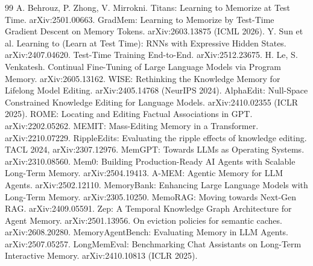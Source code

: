 \documentclass[11pt]{article}
\begin{document}
\begin{thebibliography}{99}\small
{} A. Behrouz, P. Zhong, V. Mirrokni. Titans: Learning to Memorize
  at Test Time. arXiv:2501.00663.
 GradMem: Learning to Memorize by Test-Time Gradient Descent on
  Memory Tokens. arXiv:2603.13875 (ICML 2026).
 Y. Sun et al. Learning to (Learn at Test Time): RNNs with
  Expressive Hidden States. arXiv:2407.04620.
 Test-Time Training End-to-End. arXiv:2512.23675.
 H. Le, S. Venkatesh. Continual Fine-Tuning of Large Language
  Models via Program Memory. arXiv:2605.13162.
 WISE: Rethinking the Knowledge Memory for Lifelong Model Editing.
  arXiv:2405.14768 (NeurIPS 2024).
 AlphaEdit: Null-Space Constrained Knowledge Editing for
  Language Models. arXiv:2410.02355 (ICLR 2025).
 ROME: Locating and Editing Factual Associations in GPT.
  arXiv:2202.05262.
 MEMIT: Mass-Editing Memory in a Transformer. arXiv:2210.07229.
 RippleEdits: Evaluating the ripple effects of knowledge
  editing. TACL 2024, arXiv:2307.12976.
 MemGPT: Towards LLMs as Operating Systems. arXiv:2310.08560.
 Mem0: Building Production-Ready AI Agents with Scalable Long-Term
  Memory. arXiv:2504.19413.
 A-MEM: Agentic Memory for LLM Agents. arXiv:2502.12110.
 MemoryBank: Enhancing Large Language Models with Long-Term
  Memory. arXiv:2305.10250.
 MemoRAG: Moving towards Next-Gen RAG. arXiv:2409.05591.
 Zep: A Temporal Knowledge Graph Architecture for Agent Memory.
  arXiv:2501.13956.
 On eviction policies for semantic caches. arXiv:2608.20280.
 MemoryAgentBench: Evaluating Memory in LLM Agents.
  arXiv:2507.05257.
 LongMemEval: Benchmarking Chat Assistants on Long-Term
  Interactive Memory. arXiv:2410.10813 (ICLR 2025).
\end{thebibliography}
\end{document}
